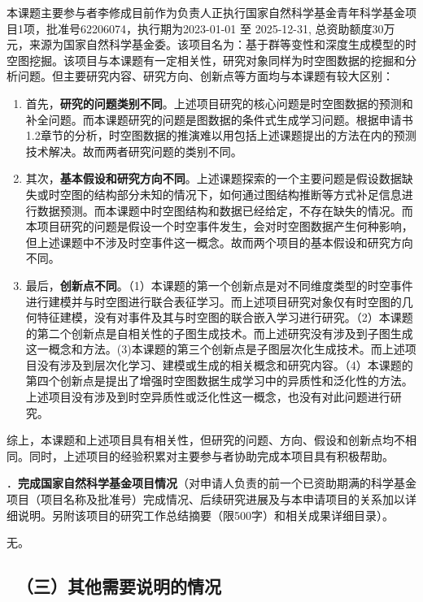 \documentclass[12pt,UTF8,AutoFakeBold=2,a4paper]{ctexart} %
\newcommand{\sihao}{\fontsize{14pt}{\baselineskip}\selectfont}
\begin{document}
本课题主要参与者李修成目前作为负责人正执行国家自然科学基金青年科学基金项目1项，批准号62206074，执行期为2023-01-01 至 2025-12-31, 总资助额度30万元，来源为国家自然科学基金委。该项目名为：基于群等变性和深度生成模型的时空图挖掘。该项目与本课题有一定相关性，研究对象同样为时空图数据的挖掘和分析问题。但主要研究内容、研究方向、创新点等方面均与本课题有较大区别：
\begin{enumerate}
    \item 首先，\textbf{研究的问题类别不同}。上述项目研究的核心问题是时空图数据的预测和补全问题。而本课题研究的问题是图数据的条件式生成学习问题。根据申请书1.2章节的分析，时空图数据的推演难以用包括上述课题提出的方法在内的预测技术解决。故而两者研究问题的类别不同。

    \item 其次，\textbf{基本假设和研究方向不同}。上述课题探索的一个主要问题是假设数据缺失或时空图的结构部分未知的情况下，如何通过图结构推断等方式补足信息进行数据预测。而本课题中时空图结构和数据已经给定，不存在缺失的情况。而本项目研究的问题是假设一个时空事件发生，会对时空图数据产生何种影响，但上述课题中不涉及时空事件这一概念。故而两个项目的基本假设和研究方向不同。

    \item 最后，\textbf{创新点不同}。（1）本课题的第一个创新点是对不同维度类型的时空事件进行建模并与时空图进行联合表征学习。而上述项目研究对象仅有时空图的几何特征建模，没有对事件及其与时空图的联合嵌入学习进行研究。（2）本课题的第二个创新点是自相关性的子图生成技术。而上述研究没有涉及到子图生成这一概念和方法。(3)本课题的第三个创新点是子图层次化生成技术。而上述项目没有涉及到层次化学习、建模或生成的相关概念和研究内容。（4）本课题的第四个创新点是提出了增强时空图数据生成学习中的异质性和泛化性的方法。上述项目没有涉及到时空异质性或泛化性这一概念，也没有对此问题进行研究。
\end{enumerate}
综上，本课题和上述项目具有相关性，但研究的问题、方向、假设和创新点均不相同。同时，上述项目的经验积累对主要参与者协助完成本项目具有积极帮助。

{\sihao \color{MsBlue} ．{\bfseries 完成国家自然科学基金项目情况}（对申请人负责的前一个已资助期满的科学基金项目（项目名称及批准号）完成情况、后续研究进展及与本申请项目的关系加以详细说明。另附该项目的研究工作总结摘要（限500字）和相关成果详细目录）。}

无。

{\color{MsBlue} \subsection{\sihao \kaishu \quad \ （三）其他需要说明的情况 }}
\end{document}
